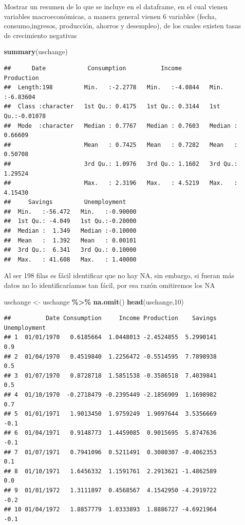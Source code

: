\documentclass[
]{article}
\newenvironment{Shaded}{\begin{snugshade}}{\end{snugshade}}
\newcommand{\DecValTok}[1]{\textcolor[rgb]{0.00,0.00,0.81}{#1}}
\newcommand{\FunctionTok}[1]{\textcolor[rgb]{0.13,0.29,0.53}{\textbf{#1}}}
\newcommand{\NormalTok}[1]{#1}
\newcommand{\OtherTok}[1]{\textcolor[rgb]{0.56,0.35,0.01}{#1}}
\newcommand{\SpecialCharTok}[1]{\textcolor[rgb]{0.81,0.36,0.00}{\textbf{#1}}}
\begin{document}
Mostrar un resumen de lo que se incluye en el dataframe, en el cual
vienen variables macroeconómicas, a manera general vienen 6 variables
(fecha, consumo,ingresos, producción, ahorros y desempleo), de los
cuales existen tasas de crecimiento negativas

\begin{Shaded}
\begin{Highlighting}[]
\FunctionTok{summary}\NormalTok{(uschange)}
\end{Highlighting}
\end{Shaded}

\begin{verbatim}
##      Date            Consumption          Income          Production      
##  Length:198         Min.   :-2.2778   Min.   :-4.0844   Min.   :-6.83604  
##  Class :character   1st Qu.: 0.4175   1st Qu.: 0.3144   1st Qu.:-0.01078  
##  Mode  :character   Median : 0.7767   Median : 0.7603   Median : 0.66609  
##                     Mean   : 0.7425   Mean   : 0.7282   Mean   : 0.50708  
##                     3rd Qu.: 1.0976   3rd Qu.: 1.1602   3rd Qu.: 1.29524  
##                     Max.   : 2.3196   Max.   : 4.5219   Max.   : 4.15430  
##     Savings         Unemployment     
##  Min.   :-56.472   Min.   :-0.90000  
##  1st Qu.: -4.049   1st Qu.:-0.20000  
##  Median :  1.349   Median :-0.10000  
##  Mean   :  1.392   Mean   : 0.00101  
##  3rd Qu.:  6.341   3rd Qu.: 0.10000  
##  Max.   : 41.608   Max.   : 1.40000
\end{verbatim}

Al ser 198 filas es fácil identificar que no hay NA, sin embargo, si
fueran más datos no lo identificaríamos tan fácil, por esa razón
omitiremos los NA

\begin{Shaded}
\begin{Highlighting}[]
\NormalTok{uschange }\OtherTok{\textless{}{-}}\NormalTok{ uschange }\SpecialCharTok{\%\textgreater{}\%} \FunctionTok{na.omit}\NormalTok{()}
\FunctionTok{head}\NormalTok{(uschange,}\DecValTok{10}\NormalTok{)}
\end{Highlighting}
\end{Shaded}

\begin{verbatim}
##          Date Consumption     Income Production    Savings Unemployment
## 1  01/01/1970   0.6185664  1.0448013 -2.4524855  5.2990141          0.9
## 2  01/04/1970   0.4519840  1.2256472 -0.5514595  7.7898938          0.5
## 3  01/07/1970   0.8728718  1.5851538 -0.3586518  7.4039841          0.5
## 4  01/10/1970  -0.2718479 -0.2395449 -2.1856909  1.1698982          0.7
## 5  01/01/1971   1.9013450  1.9759249  1.9097644  3.5356669         -0.1
## 6  01/04/1971   0.9148773  1.4459085  0.9015695  5.8747636         -0.1
## 7  01/07/1971   0.7941096  0.5211491  0.3080307 -0.4062353          0.1
## 8  01/10/1971   1.6456332  1.1591761  2.2913621 -1.4862589          0.0
## 9  01/01/1972   1.3111897  0.4568567  4.1542950 -4.2919722         -0.2
## 10 01/04/1972   1.8857779  1.0333893  1.8886727 -4.6921964         -0.1
\end{verbatim}
\end{document}
